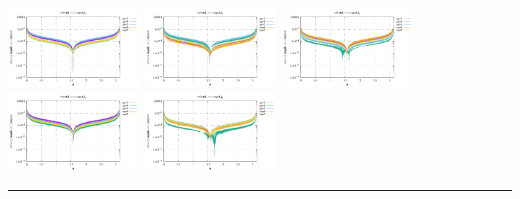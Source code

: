 \noindent
\includegraphics[width=3.5cm]{python_codes/fieldstone_152/RESULTS/exp1/vel_128_m2}
\includegraphics[width=3.5cm]{python_codes/fieldstone_152/RESULTS/exp1/vel_128_m3}
\includegraphics[width=3.5cm]{python_codes/fieldstone_152/RESULTS/exp1/vel_128_m4}
\includegraphics[width=3.5cm]{python_codes/fieldstone_152/RESULTS/exp1/vel_128_m5}
\includegraphics[width=3.5cm]{python_codes/fieldstone_152/RESULTS/exp1/vel_128_m6}

\hrule

